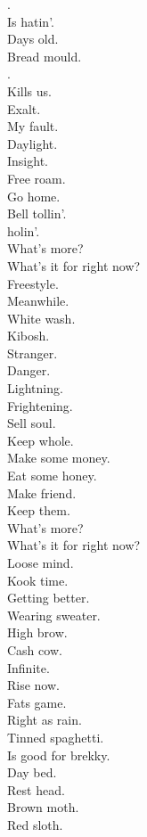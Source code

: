 . \\
Is hatin'. \\
Days old. \\
Bread mould. \\
. \\
Kills us. \\
Exalt. \\
My fault. \\

Daylight. \\
Insight. \\
Free roam. \\
Go home. \\
Bell tollin'. \\
 holin'. \\
What's more? \\
What's it for right now? \\

Freestyle. \\
Meanwhile. \\
White wash. \\
Kibosh. \\
Stranger. \\
Danger. \\
Lightning. \\
Frightening. \\

Sell soul. \\
Keep whole. \\
Make some money. \\
Eat some honey. \\
Make friend. \\
Keep them. \\
What's more? \\
What's it for right now? \\

Loose mind. \\
Kook time. \\
Getting better. \\
Wearing sweater. \\
High brow. \\
Cash cow. \\
Infinite. \\
Rise now. \\

Fats game. \\
Right as rain. \\
Tinned spaghetti. \\
Is good for brekky. \\
Day bed. \\
Rest head. \\
Brown moth. \\
Red sloth. \\

